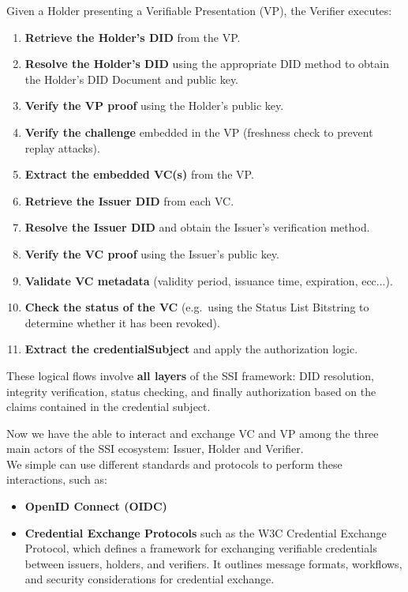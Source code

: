 Given a Holder presenting a Verifiable Presentation (VP), the Verifier executes:

\begin{enumerate}
    \item \textbf{Retrieve the Holder's DID} from the VP.
    
    \item \textbf{Resolve the Holder's DID} using the appropriate DID method to obtain the
    Holder’s DID Document and public key.
    
    \item \textbf{Verify the VP proof} using the Holder's public key.
    
    \item \textbf{Verify the challenge} embedded in the VP  
    (freshness check to prevent replay attacks).
    
    \item \textbf{Extract the embedded VC(s)} from the VP.
    
    \item \textbf{Retrieve the Issuer DID} from each VC.
    
    \item \textbf{Resolve the Issuer DID} and obtain the Issuer's verification method.
    
    \item \textbf{Verify the VC proof} using the Issuer’s public key.
    
    \item \textbf{Validate VC metadata} (validity period, issuance time, expiration, ecc...).
    
    \item \textbf{Check the status of the VC}  
    (e.g.\ using the Status List Bitstring to determine whether it has been revoked).
    
    \item \textbf{Extract the credentialSubject} and apply the authorization logic.
\end{enumerate}

\noindent
These logical flows involve \textbf{all layers} of the SSI framework: DID resolution, integrity verification, status checking, and finally authorization based on the claims contained in the credential subject.

\newpage
\noindent
Now we have the able to interact and exchange VC and VP among the three main actors of the SSI ecosystem: Issuer, Holder and Verifier.\\
We simple can use different standards and protocols to perform these interactions, such as:
\begin{itemize}
    \item \textbf{OpenID Connect (OIDC)}     
    \item \textbf{Credential Exchange Protocols} such as the W3C Credential Exchange Protocol, which defines a framework for exchanging verifiable credentials between issuers, holders, and verifiers. It outlines message formats, workflows, and security considerations for credential exchange.
\end{itemize}

